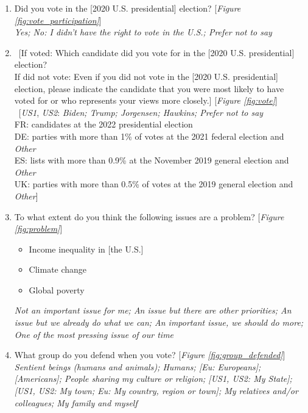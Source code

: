 \begin{enumerate}[resume]
\item \label{q:vote_participation} Did you vote in the [2020 U.S. presidential] election?  [\textit{Figure \ref{fig:vote_participation}}]
\\ \textit{Yes; No: I didn't have the right to vote in the U.S.; Prefer not to say}
\item \label{q:vote} ~[If voted: Which candidate did you vote for in the [2020 U.S. presidential] election? \\ If did not vote: Even if you did not vote in the [2020 U.S. presidential] election, please indicate the candidate that you were most likely to have voted for or who represents your views more closely.] [\textit{Figure \ref{fig:vote}}]
\\ ~[\textit{US1}, \textit{US2}: \textit{Biden; Trump; Jorgensen; Hawkins; Prefer not to say}\\ FR: candidates at the 2022 presidential election\\ DE: parties with more than 1\% of votes at the 2021 federal election and \textit{Other}\\ ES: lists with more than 0.9\% at the November 2019 general election and \textit{Other}\\ UK: parties with more than 0.5\% of votes at the 2019 general election and \textit{Other}]
\item \label{q:problem} To what extent do you think the following issues are a problem? [\textit{Figure \ref{fig:problem}}]
\begin{itemize}
    \item Income inequality in [the U.S.] 
    \item Climate change
    \item Global poverty
\end{itemize}
\textit{Not an important issue for me; An issue but there are other priorities; An issue but we already do what we can; An important issue, we should do more; One of the most pressing issue of our time}
\item \label{q:group_defended} What group do you defend when you vote? [\textit{Figure \ref{fig:group_defended}}]
\\ \textit{Sentient beings (humans and animals); Humans; [\textit{Eu}: Europeans]; [Americans]; People sharing my culture or religion; [\textit{US1}, US2: My State]; [\textit{US1}, US2: My town; \textit{Eu}: My country, region or town]; My relatives and/or colleagues; My family and myself}
\end{enumerate}

